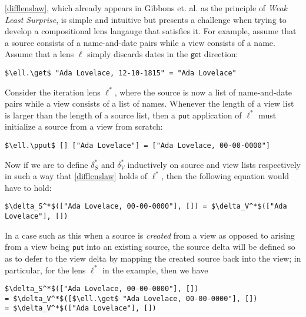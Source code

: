\documentclass[acmsmall,review,anonymous]{acmart}\settopmatter{printfolios=true,printccs=false,printacmref=false}
\theoremstyle{definition}
\newcommand{\kw}[1]{\ensuremath{\mathsf{#1}}\xspace}
\newcommand{\get}{\ensuremath{\kw{get}}\xspace}
\newcommand{\pput}{\ensuremath{\kw{put}}\xspace}
\begin{document}
\cref{difflenslaw}, which already appears in Gibbons et. al. \cite{gibbons2017principles} as the principle of {\em Weak Least Surprise}, is simple and intuitive but presents a challenge when trying to develop a compositional lens langauge that satisfies it. For example, assume that a source consists of a name-and-date pairs while a view consists of a name. Assume that a lens $\ell$ simply discards dates in the \get direction:
\begin{lstlisting}[mathescape=true]
$\ell.\get$ "Ada Lovelace, 12-10-1815" = "Ada Lovelace"
\end{lstlisting}
Consider the iteration lens $\ell^*$, where the source is now a list of name-and-date pairs while a view consists of a list of names. Whenever the length of a view list is larger than the length of a source list, then a \pput application of $\ell^*$ must initialize a source from a view from scratch:
\begin{lstlisting}[mathescape=true]
$\ell.\pput$ [] ["Ada Lovelace"] = ["Ada Lovelace, 00-00-0000"]
\end{lstlisting}
Now if we are to define $\delta_S^*$ and $\delta_V^*$ inductively on source and view lists respectively in such a way that \cref{difflenslaw} holds of $\ell^*$, then the following equation would have to hold:
\begin{lstlisting}[mathescape=true]
$\delta_S^*$(["Ada Lovelace, 00-00-0000"], []) = $\delta_V^*$(["Ada Lovelace"], [])
\end{lstlisting}
In a case such as this when a source is {\em created} from a view as opposed to arising from a view being \pput into an existing source, the source delta will be defined so as to defer to the view delta by mapping the created source back into the view; in particular, for the lens $\ell^*$ in the example, then we have
\begin{lstlisting}[mathescape=true]
$\delta_S^*$(["Ada Lovelace, 00-00-0000"], [])
= $\delta_V^*$([$\ell.\get$ "Ada Lovelace, 00-00-0000"], [])
= $\delta_V^*$(["Ada Lovelace"], [])
\end{lstlisting}
\end{document}
